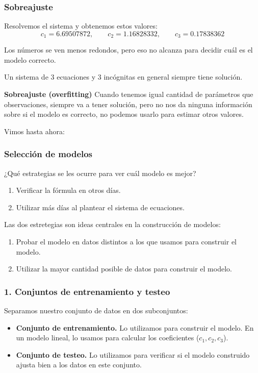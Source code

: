 \documentclass[aspectratio=169,12pt]{beamer}
\begin{document}

\begin{frame}
\frametitle{Sobreajuste}

Resolvemos el sistema y obtenemos estos valores:
$$c_1 = 6.69507872, \quad \quad c_2 = 1.16828332, \quad \quad c_3 = 0.17838362$$

Los números se ven menos redondos, pero eso no alcanza para decidir cuál es el modelo correcto.

Un sistema de 3 ecuaciones y 3 incógnitas en general siempre tiene solución.

\textbf{Sobreajuste (overfitting)} Cuando tenemos igual cantidad de parámetros que observaciones, siempre va a tener solución, pero no nos da ninguna información sobre si el modelo es correcto, no podemos usarlo para estimar otros valores.

Vimos hasta ahora:


\end{frame}



\begin{frame}
\frametitle{Selección de modelos}

¿Qué estrategias se les ocurre para ver cuál modelo es mejor?

\begin{enumerate}
\item Verificar la fórmula en otros días.
\item Utilizar más días al plantear el sistema de ecuaciones.
\end{enumerate}

\pause

Las dos estretegias son ideas centrales en la construcción de modelos:
\begin{enumerate}
\item Probar el modelo en datos distintos a los que usamos para construir el modelo.
\item Utilizar la mayor cantidad posible de datos para construir el modelo.
\end{enumerate}

\end{frame}



\begin{frame}
\frametitle{1. Conjuntos de entrenamiento y testeo}

Separamos nuestro conjunto de datos en dos subconjuntos:
\begin{itemize}
\item \textbf{Conjunto de entrenamiento.} Lo utilizamos para construir el modelo. En un modelo lineal, lo usamos para calcular los coeficientes ($c_1, c_2, c_3$).
\item \textbf{Conjunto de testeo.} Lo utilizamos para verificar si el modelo construido ajusta bien a los datos en este conjunto.
\end{itemize}

\end{frame}
\end{document}
